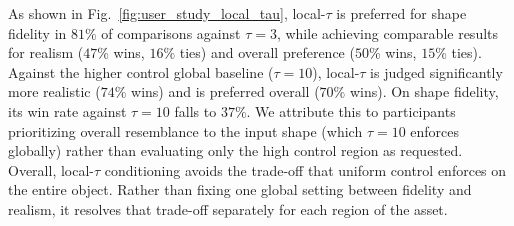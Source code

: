 As shown in Fig.~\ref{fig:user_study_local_tau}, local-$\tau$ is preferred for shape fidelity in $81\%$ of comparisons against $\tau=3$, while achieving comparable results for realism ($47\%$ wins, $16\%$ ties) and overall preference ($50\%$ wins, $15\%$ ties). Against the higher control global baseline ($\tau=10$), local-$\tau$ is judged significantly more realistic ($74\%$ wins) and is preferred overall ($70\%$ wins). On shape fidelity, its win rate against $\tau=10$ falls to $37\%$. We attribute this to participants prioritizing overall resemblance to the input shape (which $\tau=10$ enforces globally) rather than evaluating only the high control region as requested. Overall, local-$\tau$ conditioning avoids the trade-off that uniform control enforces on the entire object. Rather than fixing one global setting between fidelity and realism, it resolves that trade-off separately for each region of the asset. 



